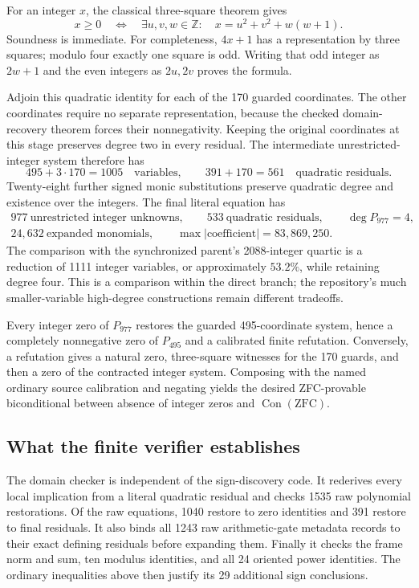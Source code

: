 For an integer $x$, the classical three-square theorem gives
\[
 x\ge0\quad\Longleftrightarrow\quad
 \exists u,v,w\in\mathbb Z:\quad x=u^2+v^2+w(w+1).
\]
Soundness is immediate.  For completeness, $4x+1$ has a representation
by three squares; modulo four exactly one square is odd.  Writing that
odd integer as $2w+1$ and the even integers as $2u,2v$ proves the formula.

Adjoin this quadratic identity for each of the 170 guarded coordinates.
The other coordinates require no separate representation, because the
checked domain-recovery theorem forces their nonnegativity.  Keeping the
original coordinates at this stage preserves degree two in every
residual.  The intermediate unrestricted-integer system therefore has
\[
 495+3\cdot170=1005\quad\text{variables},\qquad
 391+170=561\quad\text{quadratic residuals}.
\]
Twenty-eight further signed monic substitutions preserve quadratic
degree and existence over the integers.  The final literal equation has
\[
 \boxed{\begin{gathered}
 977\ \text{unrestricted integer unknowns},\qquad
 533\ \text{quadratic residuals},\qquad \deg P_{977}=4,\\
 24,632\ \text{expanded monomials},\qquad
 \max|\text{coefficient}|=83,869,250.
 \end{gathered}}
\]
The comparison with the synchronized parent's 2088-integer quartic is
a reduction of 1111 integer variables, or approximately $53.2\%$, while
retaining degree four.  This is a comparison within the direct branch;
the repository's much smaller-variable high-degree constructions remain
different tradeoffs.

Every integer zero of $P_{977}$ restores the guarded 495-coordinate
system, hence a completely nonnegative zero of $P_{495}$ and a calibrated
finite refutation.  Conversely, a refutation gives a natural zero,
three-square witnesses for the 170 guards, and then a zero of the
contracted integer system.  Composing with the named ordinary source
calibration and negating yields the desired ZFC-provable biconditional
between absence of integer zeros and $\operatorname{Con}(\mathrm{ZFC})$.

\subsection{What the finite verifier establishes}

The domain checker is independent of the sign-discovery code.  It
rederives every local implication from a literal quadratic residual and
checks 1535 raw polynomial restorations.  Of the raw equations, 1040
restore to zero identities and 391 restore to final residuals.  It also
binds all 1243 raw arithmetic-gate metadata records to their exact
defining residuals before expanding them.  Finally it checks the frame
norm and sum, ten modulus identities, and all 24 oriented power
identities.  The ordinary inequalities above then justify its 29
additional sign conclusions.

